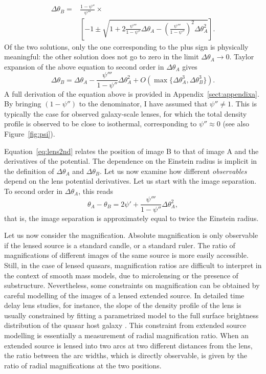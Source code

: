 \documentclass[usenatbib]{mnras}
\def\psii{\psi'}
\def\psiii{\psi''}
\def\psiiii{\psi'''}
\def\Fref#1{Figure~\ref{#1}\xspace}
\def\Eref#1{Equation~\ref{#1}\xspace}
\begin{document}
\begin{align}\label{eq:quadratic}
\Delta\theta_B = & \frac{1-\psiii}{\psiiii}\times \nonumber \\
& \left[-1 \pm \sqrt{1 + 2\frac{\psiiii}{1-\psiii}\Delta\theta_A - \left(\frac{\psiiii}{1-\psiii}\right)^2\Delta\theta_A^2}\right].
\end{align}
Of the two solutions, only the one corresponding to the plus sign is physically meaningful: the other solution does not go to zero in the limit $\Delta\theta_A \rightarrow 0$.
Taylor expansion of the above equation to second order in $\Delta\theta_A$ gives
\begin{equation}\label{eq:lens2nd}
\Delta\theta_B = \Delta\theta_A - \frac{\psiiii}{1-\psiii}\Delta\theta_A^2 + O(\max{\{\Delta\theta_A^3, \Delta\theta_B^3\}}).
\end{equation}
A full derivation of the equation above is provided in Appendix~\ref{sect:appendixa}.
By bringing $(1-\psiii)$ to the denominator, I have assumed that $\psiii\neq1$.
This is typically the case for observed galaxy-scale lenses, for which the total density profile is observed to be close to isothermal, corresponding to $\psiii\approx0$ (see also \Fref{fig:psi}).

\Eref{eq:lens2nd} relates the position of image B to that of image A and the derivatives of the potential.
The dependence on the Einstein radius is implicit in the definition of $\Delta\theta_A$ and $\Delta\theta_B$.
Let us now examine how different {\em observables} depend on the lens potential derivatives.
Let us start with the image separation. To second order in $\Delta\theta_A$, this reads
\begin{equation}\label{eq:imsep}
\theta_A - \theta_B = 2\psii + \frac{\psiiii}{1-\psiii}\Delta\theta_A^2,
\end{equation}
that is, the image separation is approximately equal to twice the Einstein radius.

Let us now consider the magnification. Absolute magnification is only observable if the lensed source is a standard candle, or a standard ruler.
The ratio of magnifications of different images of the same source is more easily accessible. Still, in the case of lensed quasars, magnification ratios are difficult to interpret in the context of smooth mass models, due to microlensing or the presence of substructure. 
Nevertheless, some constraints on magnification can be obtained by careful modelling of the images of a lensed extended source.
In detailed time delay lens studies, for instance, the slope of the density profile of the lens is usually constrained by fitting a parametrized model to the full surface brightness distribution of the quasar host galaxy \citep[see e.g.][]{Suy12}. 
This constraint from extended source modelling is essentially a measurement of radial magnification ratio. 
When an extended source is lensed into two arcs at two different distances from the lens, the ratio between the arc widths, which is directly observable, is given by the ratio of radial magnifications at the two positions.
\end{document}
